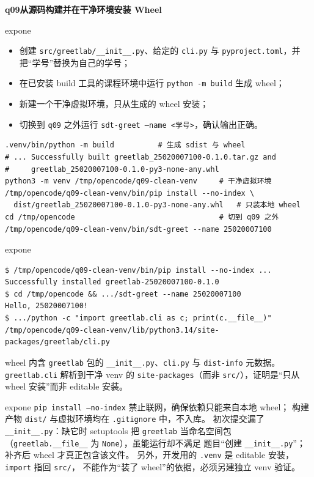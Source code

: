 \documentclass[11pt,a4paper,fontset=none]{ctexart}
\newcommand{\hwbanner}[3]{%
  \par\vspace{1.1em}
  \begin{tcolorbox}[enhanced, colback=#1!8, colframe=#1!75!black,
    boxrule=0.8pt, arc=2pt, left=7pt, right=7pt, top=4pt, bottom=4pt,
    before skip=1.1em]
    {\bfseries\color{#1!75!black}#2\qquad #3}
  \end{tcolorbox}
  \par\vspace{0.1em}\noindent\ignorespaces
}
\newcommand{\sublabel}[2]{%
  \par\vspace{0.8em}\noindent{\bfseries\color{#1!75!black}#2}\par\nobreak\vspace{0.25em}\noindent\ignorespaces
}
\begin{document}
\hwbanner{expone}{q09}{从源码构建并在干净环境安装 Wheel}
\begin{reqbox}{expone}
\begin{itemize}[leftmargin=1.4em, itemsep=1pt]
  \item 创建 \texttt{src/greetlab/\_\_init\_\_.py}、给定的 \texttt{cli.py} 与
        \texttt{pyproject.toml}，并把“学号”替换为自己的学号；
  \item 在已安装 build 工具的课程环境中运行 \texttt{python -m build} 生成 wheel；
  \item 新建一个干净虚拟环境，只从生成的 wheel 安装；
  \item 切换到 \texttt{q09} 之外运行 \texttt{sdt-greet --name <学号>}，确认输出正确。
\end{itemize}
\end{reqbox}
\sublabel{expone}{\faTerminal\ 操作过程}
\begin{lstlisting}[style=shell]
.venv/bin/python -m build          # 生成 sdist 与 wheel
# ... Successfully built greetlab_25020007100-0.1.0.tar.gz and
#     greetlab_25020007100-0.1.0-py3-none-any.whl
python3 -m venv /tmp/opencode/q09-clean-venv     # 干净虚拟环境
/tmp/opencode/q09-clean-venv/bin/pip install --no-index \
  dist/greetlab_25020007100-0.1.0-py3-none-any.whl   # 只装本地 wheel
cd /tmp/opencode                                 # 切到 q09 之外
/tmp/opencode/q09-clean-venv/bin/sdt-greet --name 25020007100
\end{lstlisting}
\begin{resbox}{expone}
\begin{lstlisting}[style=output]
$ /tmp/opencode/q09-clean-venv/bin/pip install --no-index ...
Successfully installed greetlab-25020007100-0.1.0
$ cd /tmp/opencode && .../sdt-greet --name 25020007100
Hello, 25020007100!
$ .../python -c "import greetlab.cli as c; print(c.__file__)"
/tmp/opencode/q09-clean-venv/lib/python3.14/site-packages/greetlab/cli.py
\end{lstlisting}
wheel 内含 \texttt{greetlab} 包的 \texttt{\_\_init\_\_.py}、\texttt{cli.py}
与 \texttt{dist-info} 元数据。\texttt{greetlab.cli} 解析到干净 venv 的
\texttt{site-packages}（而非 \texttt{src/}），证明是“只从 wheel 安装”而非
editable 安装。
\end{resbox}
\begin{trapbox}{expone}
  \texttt{pip install --no-index} 禁止联网，确保依赖只能来自本地 wheel；
  构建产物 \texttt{dist/} 与虚拟环境均在 \texttt{.gitignore} 中，不入库。
  初次提交漏了 \texttt{\_\_init\_\_.py}：缺它时 setuptools 把 \texttt{greetlab}
  当命名空间包（\texttt{greetlab.\_\_file\_\_} 为 \texttt{None}），虽能运行却不满足
  题目“创建 \texttt{\_\_init\_\_.py}”；补齐后 wheel 才真正包含该文件。
  另外，开发用的 \texttt{.venv} 是 editable 安装，\texttt{import} 指回 \texttt{src/}，
  不能作为“装了 wheel”的依据，必须另建独立 venv 验证。
\end{trapbox}
\end{document}
